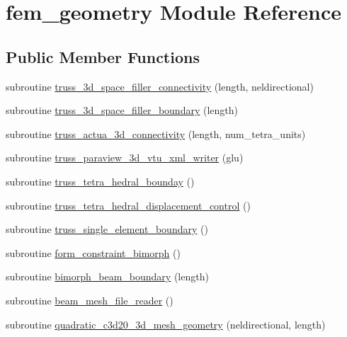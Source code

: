 \hypertarget{classfem__geometry}{}\section{fem\+\_\+geometry Module Reference}
\label{classfem__geometry}
\subsection*{Public Member Functions}
\begin{DoxyCompactItemize}
\item 
subroutine \hyperlink{classfem__geometry_af8094703fed5dfd73a98dff89ffb77b3}{truss\+\_\+3d\+\_\+space\+\_\+filler\+\_\+connectivity} (length, neldirectional)
\item 
subroutine \hyperlink{classfem__geometry_a5f105e2ba3457cc3f1ae7f8413ae5a33}{truss\+\_\+3d\+\_\+space\+\_\+filler\+\_\+boundary} (length)
\item 
subroutine \hyperlink{classfem__geometry_a760d8de2e9aad779bcdadaa3b44608ea}{truss\+\_\+actua\+\_\+3d\+\_\+connectivity} (length, num\+\_\+tetra\+\_\+units)
\item 
subroutine \hyperlink{classfem__geometry_a2ec3a26ed6230e73f10e4dffb4dae3fc}{truss\+\_\+paraview\+\_\+3d\+\_\+vtu\+\_\+xml\+\_\+writer} (glu)
\item 
subroutine \hyperlink{classfem__geometry_a8a8539eb3a148033212513ee3e962433}{truss\+\_\+tetra\+\_\+hedral\+\_\+bounday} ()
\item 
subroutine \hyperlink{classfem__geometry_a06792814c93a438d8dfa067b5f80b10c}{truss\+\_\+tetra\+\_\+hedral\+\_\+displacement\+\_\+control} ()
\item 
subroutine \hyperlink{classfem__geometry_a0d70cc094a7b9577309b69fb62fbb921}{truss\+\_\+single\+\_\+element\+\_\+boundary} ()
\item 
subroutine \hyperlink{classfem__geometry_a53ab8638a8b8ba04606fa18502dd17d8}{form\+\_\+constraint\+\_\+bimorph} ()
\item 
subroutine \hyperlink{classfem__geometry_adf88d445acd36865a2000e20f1d0e937}{bimorph\+\_\+beam\+\_\+boundary} (length)
\item 
subroutine \hyperlink{classfem__geometry_ac66776952d82e28a62557ad6fb8ebc5f}{beam\+\_\+mesh\+\_\+file\+\_\+reader} ()
\item 
subroutine \hyperlink{classfem__geometry_a9c3c144ce7e95bdd72b7264860c8303f}{quadratic\+\_\+c3d20\+\_\+3d\+\_\+mesh\+\_\+geometry} (neldirectional, length)
\item 

\end{DoxyCompactItemize}
